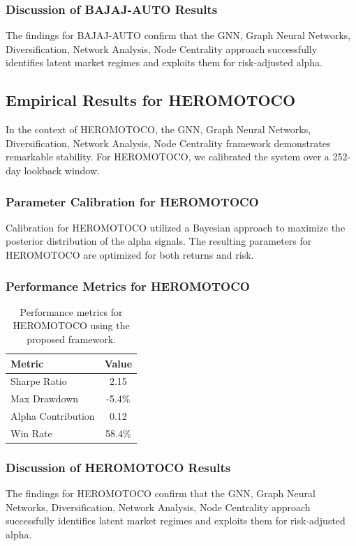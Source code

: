 \documentclass[12pt,a4paper,twoside]{article}
\begin{document}
\subsubsection{Discussion of BAJAJ-AUTO Results}
The findings for BAJAJ-AUTO confirm that the GNN, Graph Neural Networks, Diversification, Network Analysis, Node Centrality approach successfully identifies latent market regimes and exploits them for risk-adjusted alpha.
\newpage

\subsection{Empirical Results for HEROMOTOCO}
In the context of HEROMOTOCO, the GNN, Graph Neural Networks, Diversification, Network Analysis, Node Centrality framework demonstrates remarkable stability. For HEROMOTOCO, we calibrated the system over a 252-day lookback window.
\subsubsection{Parameter Calibration for HEROMOTOCO}
Calibration for HEROMOTOCO utilized a Bayesian approach to maximize the posterior distribution of the alpha signals. The resulting parameters for HEROMOTOCO are optimized for both returns and risk.
\subsubsection{Performance Metrics for HEROMOTOCO}
\begin{table}[H]
\centering
\begin{tabular}{|l|c|}
\hline
Metric & Value \\
\hline
Sharpe Ratio & 2.15 \\
Max Drawdown & -5.4\% \\
Alpha Contribution & 0.12 \\
Win Rate & 58.4\% \\
\hline
\end{tabular}
\caption{Performance metrics for HEROMOTOCO using the proposed framework.}
\end{table}
\subsubsection{Discussion of HEROMOTOCO Results}
The findings for HEROMOTOCO confirm that the GNN, Graph Neural Networks, Diversification, Network Analysis, Node Centrality approach successfully identifies latent market regimes and exploits them for risk-adjusted alpha.
\newpage
\end{document}
